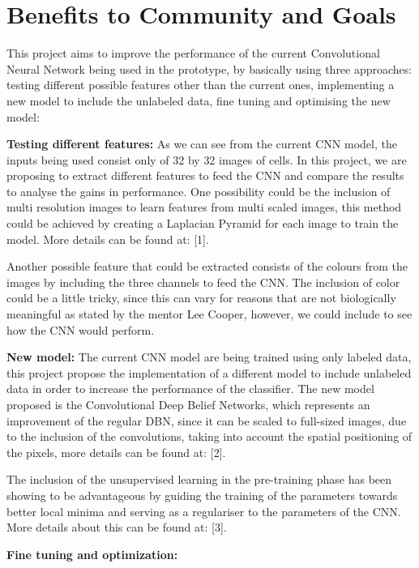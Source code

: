 \documentclass{article}
\begin{document}
\section{Benefits to Community and Goals}
This project aims to improve the performance of the current Convolutional Neural Network being used in the prototype, by basically using three approaches: testing different possible features other than the current ones, implementing a new model to include the unlabeled data, fine tuning and optimising the new model:\\\par
\textbf{Testing different features:} As we can see from the current CNN model, the inputs being used consist only of 32 by 32 images of cells. In this project, we are proposing to extract different features to feed the CNN and compare the results to analyse the gains in performance. One possibility could be the inclusion of multi resolution images to learn features from multi scaled images, this method could be achieved  by creating a Laplacian Pyramid for each image to train the model. More details can be found at: [1]. \par Another possible feature that could be extracted consists of the colours from the images by including the three channels to feed the CNN. The inclusion of color could be a little tricky, since this can vary for reasons that are not biologically meaningful as stated by the mentor Lee Cooper, however, we could include to see how the CNN would perform.\\\par
\textbf{New model:} The current CNN model are being trained using only labeled data, this project propose the implementation of a different model to include unlabeled data in order to increase the performance of the classifier. The new model proposed is the Convolutional Deep Belief Networks, which represents an improvement of the regular DBN, since it can be scaled to full-sized images, due to the inclusion of the convolutions, taking into account the spatial positioning of the pixels, more details can be found at: [2].\par
	The inclusion of the unsupervised learning in the pre-training phase has been showing to be advantageous by guiding the training of the parameters towards better local minima and serving as a regulariser to the parameters of the CNN. More details about this can be found at: [3].\\\par
	\textbf{Fine tuning and optimization:}
\end{document}
